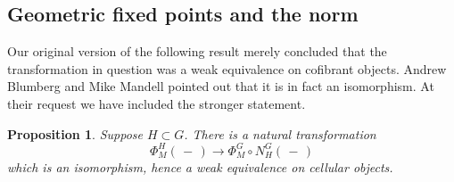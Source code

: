 \documentclass{amsart}
\newtheorem{prop}[equation]{Proposition}
\theoremstyle{definition}
\theoremstyle{remark}
\newcommand{\slot}{\,-\,}
\newcommand{\norm}{N}
\newcommand{\gfpm}[1]{\Phi_{M}^{#1}}
\newcommand{\phigm}{\gfpm{G}}
\newcommand{\phihm}{\gfpm{H}}
\begin{document}
\subsection{Geometric fixed points and the norm}
\label{sec:geom-fixed-points-norm}

Our original version of the following result merely concluded that the
transformation in question was a weak equivalence on cofibrant
objects.  Andrew Blumberg and Mike Mandell pointed out that it is in
fact an isomorphism.  At their request we have included the stronger
statement.

\begin{prop}
\label{thm:101} Suppose $H\subset G$.  There is a natural
transformation
\[
\phihm(\slot) \to \phigm\circ \norm_{H}^{G}(\slot)
\]
which is an isomorphism, hence a weak equivalence on cellular objects.
\end{prop}
\end{document}
